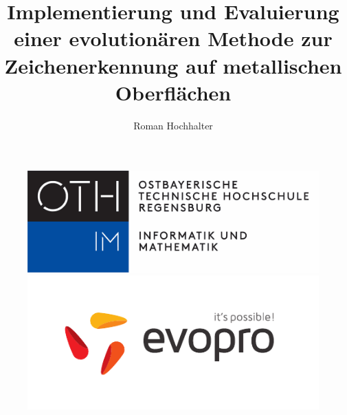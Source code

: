 \documentclass[10pt,a4paper,abstraction]{scrreprt}
\author{Roman Hochhalter}
\title{Implementierung und Evaluierung einer evolutionären Methode zur Zeichenerkennung auf metallischen Oberflächen}
\begin{document}
	\begin{titlepage}
		\begin{figure}[!htb]
			\begin{minipage}{0.48\textwidth}
				
				\includegraphics[width=0.8\linewidth]{oth-regensburg-logo}
			\end{minipage}
			\hfill
			\begin{minipage}{0.48\textwidth}
				\flushright
				\includegraphics[width=0.5\linewidth]{evopro_logo_cmyk}
			\end{minipage}
		\end{figure}
		
		\vspace*{0.5cm}
		

\end{titlepage}
\end{document}
